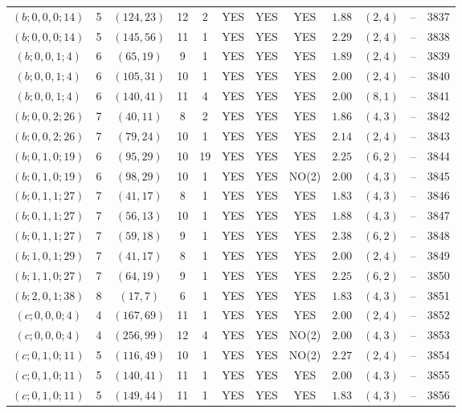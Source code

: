 \begin{longtable}{|c|c|c|c|c|c|c|c|c|c|c|c|}
$(b;0,0,0;14)$ & 5 & $(124,23)$ & 12 & 2 & YES & YES & YES & $1.88$ & $(2,4)$ & -- & 3837\\
$(b;0,0,0;14)$ & 5 & $(145,56)$ & 11 & 1 & YES & YES & YES & $2.29$ & $(2,4)$ & -- & 3838\\
$(b;0,0,1;4)$ & 6 & $(65,19)$ & 9 & 1 & YES & YES & YES & $1.89$ & $(2,4)$ & -- & 3839\\
$(b;0,0,1;4)$ & 6 & $(105,31)$ & 10 & 1 & YES & YES & YES & $2.00$ & $(2,4)$ & -- & 3840\\
$(b;0,0,1;4)$ & 6 & $(140,41)$ & 11 & 4 & YES & YES & YES & $2.00$ & $(8,1)$ & -- & 3841\\
$(b;0,0,2;26)$ & 7 & $(40,11)$ & 8 & 2 & YES & YES & YES & $1.86$ & $(4,3)$ & -- & 3842\\
$(b;0,0,2;26)$ & 7 & $(79,24)$ & 10 & 1 & YES & YES & YES & $2.14$ & $(2,4)$ & -- & 3843\\
$(b;0,1,0;19)$ & 6 & $(95,29)$ & 10 & 19 & YES & YES & YES & $2.25$ & $(6,2)$ & -- & 3844\\
$(b;0,1,0;19)$ & 6 & $(98,29)$ & 10 & 1 & YES & YES & NO(2) & $2.00$ & $(4,3)$ & -- & 3845\\
$(b;0,1,1;27)$ & 7 & $(41,17)$ & 8 & 1 & YES & YES & YES & $1.83$ & $(4,3)$ & -- & 3846\\
$(b;0,1,1;27)$ & 7 & $(56,13)$ & 10 & 1 & YES & YES & YES & $1.88$ & $(4,3)$ & -- & 3847\\
$(b;0,1,1;27)$ & 7 & $(59,18)$ & 9 & 1 & YES & YES & YES & $2.38$ & $(6,2)$ & -- & 3848\\
$(b;1,0,1;29)$ & 7 & $(41,17)$ & 8 & 1 & YES & YES & YES & $2.00$ & $(2,4)$ & -- & 3849\\
$(b;1,1,0;27)$ & 7 & $(64,19)$ & 9 & 1 & YES & YES & YES & $2.25$ & $(6,2)$ & -- & 3850\\
$(b;2,0,1;38)$ & 8 & $(17,7)$ & 6 & 1 & YES & YES & YES & $1.83$ & $(4,3)$ & -- & 3851\\
$(c;0,0,0;4)$ & 4 & $(167,69)$ & 11 & 1 & YES & YES & YES & $2.00$ & $(2,4)$ & -- & 3852\\
$(c;0,0,0;4)$ & 4 & $(256,99)$ & 12 & 4 & YES & YES & NO(2) & $2.00$ & $(4,3)$ & -- & 3853\\
$(c;0,1,0;11)$ & 5 & $(116,49)$ & 10 & 1 & YES & YES & NO(2) & $2.27$ & $(2,4)$ & -- & 3854\\
$(c;0,1,0;11)$ & 5 & $(140,41)$ & 11 & 1 & YES & YES & YES & $2.00$ & $(4,3)$ & -- & 3855\\
$(c;0,1,0;11)$ & 5 & $(149,44)$ & 11 & 1 & YES & YES & YES & $1.83$ & $(4,3)$ & -- & 3856\\

\end{longtable}
